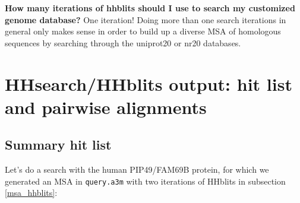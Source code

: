 \documentclass[11pt,a4paper]{article}
\begin{document}
{\bf How many iterations of hhblits should I use to search my customized genome database?} One iteration! Doing more than one search iterations in general only makes sense in order to build up a diverse MSA of homologous sequences by searching through the uniprot20 or nr20 databases. 




\section{HHsearch/HHblits output: hit list and pairwise alignments}\label{outformat}

\subsection{Summary hit list}

Let's do a search with the human PIP49/FAM69B protein, for which we generated an MSA in \verb`query.a3m` with two iterations of HHblits in subsection \ref{msa_hhblits}:
\end{document}
